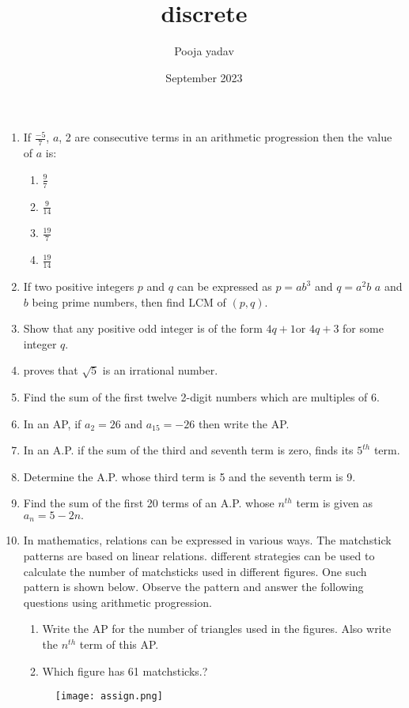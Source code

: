 \documentclass{article}
\title{discrete}
\author{Pooja yadav}
\date{September 2023}
\begin{document}
\maketitle

\begin{enumerate}
    



\item If   $\frac{-5}{7}$, $a$, 2 are consecutive terms in an arithmetic progression then the value of $a$ is:
   \begin{enumerate}
    
    \item $\frac{9}{7}$
    \item $\frac{9}{14}$
    \item $\frac{19}{7}$
    \item $\frac{19}{14}$
\end{enumerate}

 \item If two positive integers $p$ and $q$ can be expressed as $p = ab^3$ and $q = a^2b$ $a$ and $b$ being prime numbers, then find LCM of $(p,q)$.

\item Show that any positive odd integer is of the form $4q + 1 $or $4q + 3$ for some integer $q$.
\item proves that $\sqrt{5}$ is an irrational number.
\item Find the sum of the first twelve 2-digit numbers which are multiples of 6.   
    
\item In an AP, if $a_2 = 26$ and $a_{15} = -26$ then write the AP. 
 \item In an A.P. if the sum of the third and seventh term is zero, finds its $5^{th}$
    term.
\item Determine the A.P. whose third term is 5 and the seventh term is 9.
\item Find the sum of the first 20 terms of an A.P. whose $n^{th}$ term is given as $a_n= 5 - 2n.$
\item In mathematics, relations can be expressed in various ways. The matchstick patterns are based on linear relations. different strategies can be used to calculate the number of matchsticks used in different figures.
 One such pattern is shown below. Observe the pattern and answer the following questions using arithmetic progression.
  

\begin{enumerate}
\item Write the AP for the number of triangles used in the figures. Also
write the $n^{th}$ term of this AP.
\item Which figure has 61 matchsticks.? 
\end{enumerate}
\begin{figure}
\centering
\texttt{[image: assign.png]}
\caption{}
\end{figure} 




\end{enumerate}
\end{document}
